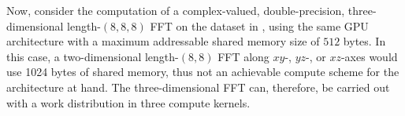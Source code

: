 \documentclass[11pt, onecolumn, journal,compsoc]{IEEEtran}
\newcounter{pgfcurrentmatrix}
\theoremstyle{problemstyle}
\begin{document}
Now, consider the computation of a complex-valued, double-precision, three-dimensional length-$(8,8,8)$ FFT on the dataset in , using the same GPU architecture with a maximum addressable shared memory size of $512$ bytes. In this case, a two-dimensional length-$(8,8)$ FFT along $xy$-, $yz$-, or $xz$-axes would use 1024 bytes of shared memory, thus not an achievable compute scheme for the architecture at hand. The three-dimensional FFT can, therefore, be carried out with a work distribution in three compute kernels. 

\begin{figure}[H]  
  \centering  

\end{figure}
\end{document}
